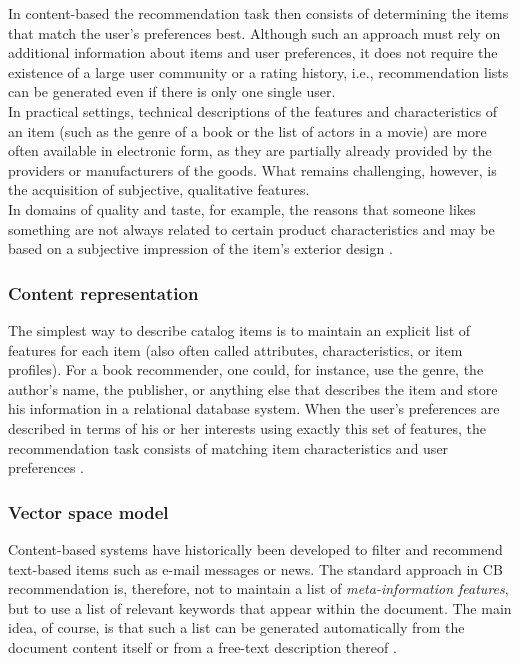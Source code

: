 In content-based the recommendation task then consists of determining
the items that match the user’s preferences best. Although such an
approach must rely on additional information about items and user
preferences, it does not require the existence of a large user
community or a rating history, i.e., recommendation lists can be
generated even if there is only one single user. \\In practical
settings, technical descriptions of the features and characteristics
of an item (such as the genre of a book or the list of actors in a
movie) are more often available in electronic form, as they are
partially already provided by the providers or manufacturers of the
goods. What remains challenging, however, is the acquisition of
subjective, qualitative features. \\In domains of quality and taste, for
example, the reasons that someone likes something are not always
related to certain product characteristics and may be based on a
subjective impression of the item’s exterior design 
\cite{jannach2010recommender}.   

\subsubsection{Content representation} 

The simplest way to describe catalog
items is to maintain an explicit list of features for each item (also
often called attributes, characteristics, or item profiles). For a
book recommender, one could, for instance, use the genre, the author’s
name, the publisher, or anything else that describes the item and
store his information in a relational database system. When the user’s
preferences are described in terms of his or her interests using
exactly this set of features, the recommendation task consists of
matching item characteristics and user preferences 
\cite{jannach2010recommender}.  

\subsubsection{Vector space model}  

Content-based systems have historically
been developed to filter and recommend text-based items such as e-mail
messages or news. The standard approach in CB recommendation is,
therefore, not to maintain a list of \textit{meta-information
features}, but to use a list of relevant keywords that appear within
the document. The main idea, of course, is that such a list can be
generated automatically from the document content itself or from a
free-text description thereof \cite{jannach2010recommender}.

